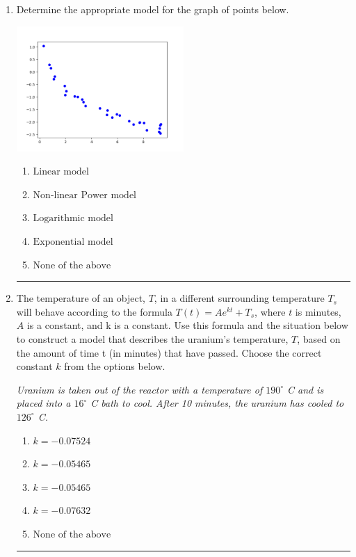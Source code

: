 \documentclass[14pt]{extbook}
\newcommand{\litem}[1]{\item#1\hspace*{-1cm}\rule{\textwidth}{0.4pt}}
\begin{document}
\begin{enumerate}
{\begin{enumerate}[label=\Alph*.]
\end{enumerate} }
\litem{
Determine the appropriate model for the graph of points below.
\begin{center}
    \includegraphics[width=0.5\textwidth]{../Figures/identifyModelGraph12C.png}
\end{center}
\begin{enumerate}[label=\Alph*.]
\item \( \text{Linear model} \)
\item \( \text{Non-linear Power model} \)
\item \( \text{Logarithmic model} \)
\item \( \text{Exponential model} \)
\item \( \text{None of the above} \)

\end{enumerate} }
\litem{
The temperature of an object, $T$, in a different surrounding temperature $T_s$ will behave according to the formula $T(t) = Ae^{kt} + T_s$, where $t$ is minutes, $A$ is a constant, and k is a constant. Use this formula and the situation below to construct a model that describes the uranium's temperature, $T$, based on the amount of time t (in minutes) that have passed. Choose the correct constant $k$ from the options below.
\begin{center}
    \textit{ Uranium is taken out of the reactor with a temperature of $190^{\circ}$ C and is placed into a $16^{\circ}$ C bath to cool. After 10 minutes, the uranium has cooled to $126^{\circ}$ C. }
\end{center}
\begin{enumerate}[label=\Alph*.]
\item \( k = -0.07524 \)
\item \( k = -0.05465 \)
\item \( k = -0.05465 \)
\item \( k = -0.07632 \)
\item \( \text{None of the above} \)


\end{enumerate}}
\end{enumerate}
\end{document}

